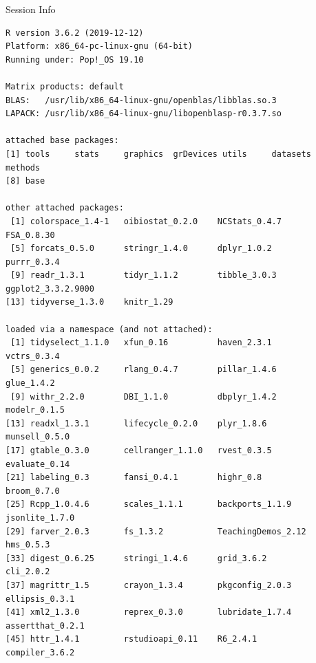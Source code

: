 \documentclass[10pt]{beamer}\usepackage[]{graphicx}\usepackage[]{color}
\makeatletter
\newenvironment{kframe}{%
 \def\at@end@of@kframe{}%
 \ifinner\ifhmode%
  \def\at@end@of@kframe{\end{minipage}}%
  \begin{minipage}{\columnwidth}%
 \fi\fi%
 \def\FrameCommand##1{\hskip\@totalleftmargin \hskip-\fboxsep
 \colorbox{shadecolor}{##1}\hskip-\fboxsep
     \hskip-\linewidth \hskip-\@totalleftmargin \hskip\columnwidth}%
 \MakeFramed {\advance\hsize-\width
   \@totalleftmargin\z@ \linewidth\hsize
   \@setminipage}}%
 {\par\unskip\endMakeFramed%
 \at@end@of@kframe}
\newenvironment{knitrout}{}{} %
\makeatother
\begin{document}
	
	\begin{frame}[fragile]{Session Info}
		\tiny
		
\begin{knitrout}\tiny
{}\color{fgcolor}\begin{kframe}
\begin{verbatim}
R version 3.6.2 (2019-12-12)
Platform: x86_64-pc-linux-gnu (64-bit)
Running under: Pop!_OS 19.10

Matrix products: default
BLAS:   /usr/lib/x86_64-linux-gnu/openblas/libblas.so.3
LAPACK: /usr/lib/x86_64-linux-gnu/libopenblasp-r0.3.7.so

attached base packages:
[1] tools     stats     graphics  grDevices utils     datasets  methods  
[8] base     

other attached packages:
 [1] colorspace_1.4-1   oibiostat_0.2.0    NCStats_0.4.7      FSA_0.8.30        
 [5] forcats_0.5.0      stringr_1.4.0      dplyr_1.0.2        purrr_0.3.4       
 [9] readr_1.3.1        tidyr_1.1.2        tibble_3.0.3       ggplot2_3.3.2.9000
[13] tidyverse_1.3.0    knitr_1.29        

loaded via a namespace (and not attached):
 [1] tidyselect_1.1.0   xfun_0.16          haven_2.3.1        vctrs_0.3.4       
 [5] generics_0.0.2     rlang_0.4.7        pillar_1.4.6       glue_1.4.2        
 [9] withr_2.2.0        DBI_1.1.0          dbplyr_1.4.2       modelr_0.1.5      
[13] readxl_1.3.1       lifecycle_0.2.0    plyr_1.8.6         munsell_0.5.0     
[17] gtable_0.3.0       cellranger_1.1.0   rvest_0.3.5        evaluate_0.14     
[21] labeling_0.3       fansi_0.4.1        highr_0.8          broom_0.7.0       
[25] Rcpp_1.0.4.6       scales_1.1.1       backports_1.1.9    jsonlite_1.7.0    
[29] farver_2.0.3       fs_1.3.2           TeachingDemos_2.12 hms_0.5.3         
[33] digest_0.6.25      stringi_1.4.6      grid_3.6.2         cli_2.0.2         
[37] magrittr_1.5       crayon_1.3.4       pkgconfig_2.0.3    ellipsis_0.3.1    
[41] xml2_1.3.0         reprex_0.3.0       lubridate_1.7.4    assertthat_0.2.1  
[45] httr_1.4.1         rstudioapi_0.11    R6_2.4.1           compiler_3.6.2    
\end{verbatim}
\end{kframe}
\end{knitrout}
		
	\end{frame}
	
\end{document}
